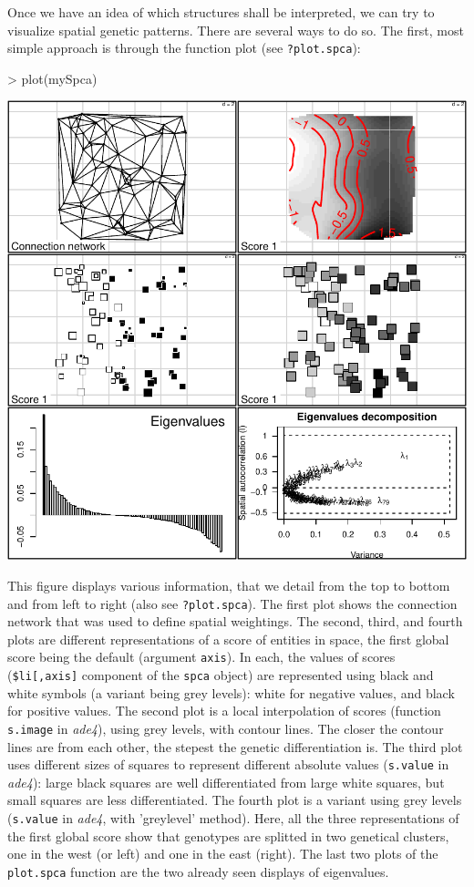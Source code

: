 \documentclass{article}
\begin{document}
Once we have an idea of which structures shall be interpreted, we can
try to visualize spatial genetic patterns.
There are several ways to do so.
The first, most simple approach is through the function plot (see \texttt{?plot.spca}):
\begin{Schunk}
\begin{Sinput}
> plot(mySpca)
\end{Sinput}
\end{Schunk}
\includegraphics{spca-plotspca}


\noindent This figure displays various information, that we detail from
the top to bottom and from left to right (also see \texttt{?plot.spca}).
The first plot shows the connection network that was used to define
spatial weightings.
The second, third, and fourth plots are different representations of
a score of entities in space, the first global score being the default (argument
\texttt{axis}).
In each, the values of scores (\texttt{\$li[,axis]} component of the
\texttt{spca} object) are represented using black and white symbols
(a variant being grey levels): white for negative values, and black
for positive values.
The second plot is a local interpolation of scores (function
\texttt{s.image} in \textit{ade4}), using grey levels, with contour lines.
The closer the contour lines are from each other, the stepest the
genetic differentiation is.
The third plot uses different sizes of squares to represent different
absolute values (\texttt{s.value} in \textit{ade4}): large black squares are well differentiated from
large white squares, but small squares are less differentiated.
The fourth plot is a variant using grey levels (\texttt{s.value} in
\textit{ade4}, with 'greylevel' method).
Here, all the three representations of the first global score show
that genotypes are splitted in two genetical clusters, one in the west
(or left) and one in the east (right).
The last two plots of the \texttt{plot.spca} function are the two
already seen displays of eigenvalues.
\\
\end{document}
